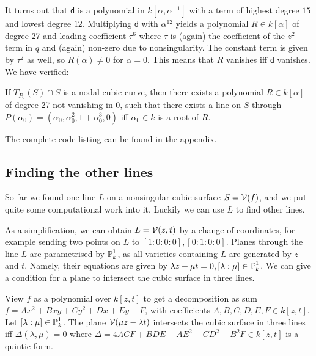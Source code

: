 It turns out that \verb|d| is a polynomial in $k[\alpha,\alpha^{-1}]$ with a term of highest degree $15$ and lowest degree $12$.
Multiplying \verb|d| with $\alpha^{12}$ yields a polynomial $R\in k[\alpha]$ of degree 27 and leading coefficient $\tau^6$ where $\tau$ is (again) the coefficient of the $z^2$ term in $q$ and (again) non-zero due to nonsingularity.
The constant term is given by $\tau^2$ as well, so $R(\alpha) \neq 0$ for $\alpha = 0$. This means that $R$ vanishes iff \verb|d| vanishes.
We have verified:
\begin{proposition}
If $T_{P_0}(S) \cap S$ is a nodal cubic curve, then there exists a polynomial $R \in k[\alpha]$ of degree 27 not vanishing in 0, such that there exists a line on $S$ through $P(\alpha_0) = (\alpha_0,\alpha_0^2,1+\alpha_0^3,0)$ iff $\alpha_0 \in k$ is a root of $R$.
\end{proposition}
The complete code listing can be found in the appendix.

\subsection{Finding the other lines}

So far we found one line $L$ on a nonsingular cubic surface $S = \operatorname{\mathcal V}(f)$, and we put quite some computational work into it.
Luckily we can use $L$ to find other lines.

As a simplification, we can obtain $L=\operatorname{\mathcal V}(z,t)$ by a change of coordinates, for example sending two points on $L$ to $[1:0:0:0],[0:1:0:0]$.
Planes through the line $L$ are parametrised by $\operatorname{\mathbb P}^1_k$, as all varieties containing $L$ are generated by $z$ and $t$.
Namely, their equations are given by $\lambda z + \mu t = 0, [\lambda:\mu] \in \operatorname{\mathbb P}^1_k$.
We can give a condition for a plane to intersect the cubic surface in three lines.

\begin{lemma} \label{lemmaDelta}
View $f$ as a polynomial over $k[z,t]$ to get a decomposition as sum $f = Ax^2 + Bxy + Cy^2 + Dx + Ey + F$, with coefficients $A,B,C,D,E,F \in k[z,t]$.
Let $[\lambda:\mu] \in \operatorname{\mathbb P}^1_k$.
The plane $\operatorname{\mathcal V}(\mu z - \lambda t)$ intersects the cubic surface in three lines iff
$\Delta(\lambda,\mu) = 0$ where $\Delta = 4ACF + BDE - AE^2 - CD^2 - B^2F \in k[z,t]$ is a quintic form.
\end{lemma}


